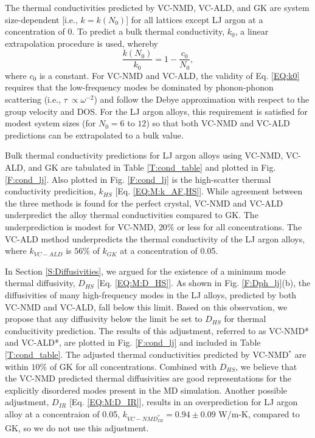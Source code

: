 \documentclass[aps,prb,onecolumn,preprint,footinbib,superscriptaddress,amsmath,amssymb,floatfix]{revtex4}
\begin{document}
The thermal conductivities predicted by VC-NMD, VC-ALD, and GK are system 
size-dependent [i.e., $k = k(N_0)$] for all lattices except LJ argon at a 
concentration of 0. To predict a bulk thermal conductivity, $k_0$,  
a linear extrapolation procedure is 
used, whereby 
\begin{equation}\label{EQ:k0}
\frac{k(N_0)}{k_0} = 1 - \frac{c_0}{N_0},
\end{equation}
where $c_0$ is a constant.\cite{shiomi_thermal_2011} 
For VC-NMD and VC-ALD, the validity of Eq. \eqref{EQ:k0}  
requires that the low-frequency modes be dominated by 
phonon-phonon scattering (i.e., $\tau\ \propto \omega^{-2}$) and  
follow the Debye approximation 
with respect to the group velocity and DOS.
\cite{shiomi_thermal_2011,esfarjani_heat_2011} For the LJ 
argon alloys, this requirement is satisfied for modest system sizes 
(for $N_0 = 6$ to $12$) so that both VC-NMD and VC-ALD predictions 
can be extrapolated to a bulk value. 

Bulk thermal conductivity predictions for LJ argon alloys using  
VC-NMD, VC-ALD, and GK are tabulated in Table \ref{T:cond_table} 
and plotted in Fig. \ref{F:cond_lj}. Also plotted 
in Fig. \ref{F:cond_lj} is the high-scatter 
thermal conductivity predicition, $k_{HS}$ 
[Eq. \eqref{EQ:M:k_AF,HS}]. 
While agreement between the three methods is found for the perfect 
crystal, VC-NMD and VC-ALD underpredict the alloy thermal 
conductivities compared to GK.  
The underprediction is modest for VC-NMD, $20\%$ or less 
for all concentrations. The VC-ALD method underpredicts the 
thermal conductivity of the LJ argon alloys, where $k_{VC-ALD}$ is 
$56\%$ of $k_{GK}$ at a concentration of 0.05. 

In Section \ref{S:Diffusivities}, 
we argued for the existence of a minimum mode thermal 
diffusivity, $D_{HS}$ [Eq. \eqref{EQ:M:D_HS}]. 
As shown in Fig. \ref{F:Dph_lj}(b), the diffusivities of 
many high-frequency modes in the LJ alloys, predicted by both VC-NMD 
and VC-ALD, fall below this limit.  Based on this observation, we propose 
that any diffusivity below the limit be set to $D_{HS}$ 
for thermal conducitivity prediction. 
The results of this adjustment, 
referred to as VC-NMD* and VC-ALD*, are plotted in Fig. \ref{F:cond_lj} 
and included in Table \ref{T:cond_table}.  
The adjusted thermal conductivities predicted by VC-NMD$^*$ are 
within $10\%$ of GK for all concentrations. 
Combined with $D_{HS}$, we believe that the VC-NMD predicted thermal 
diffusivities are good representations for the explicitly 
disordered modes present in the MD simulation. Another possible 
adjustment, $D_{IR}$ [Eq. \eqref{EQ:M:D_IR}], results in an overprediction 
for LJ argon alloy at a concentraion of 0.05, 
$k_{VC-NMD^*_{IR}} = 0.94 \pm 0.09$ W/m-K, compared to GK, so we do 
not use this adjustment. 
\end{document}
